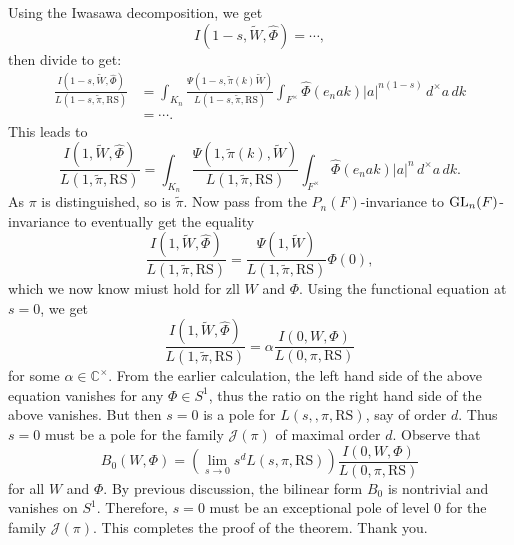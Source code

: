 \documentclass[reqno]{amsart} 
\begin{document}
Using the Iwasawa decomposition, we get
\begin{equation*}
  I(1 - s, \tilde{W}, \hat{\Phi})
  = \dotsb,
\end{equation*}
then divide to get:
\begin{align*}
  \frac{I(1 - s, \tilde{W}, \hat{\Phi})}{L(1 - s, \tilde{\pi}, \mathrm{RS})}
  &= \int_{K_n}
    \frac{\Psi(1 - s, \tilde{\pi}(k) \tilde{W})}{ L(1 - s, \tilde{\pi}, \mathrm{RS})}
    \int_{F^\times} \hat{\Phi}(e_n a k) \lvert a \rvert^{n(1 - s)} \, d ^\times  a \, d k \\
  &=
    \dotsb.
\end{align*}
This leads to
\begin{equation*}
  \frac{I(1, \tilde{W}, \hat{\Phi})}{L(1, \tilde{\pi}, \mathrm{RS})}
  = \int_{K_n}
  \frac{\Psi(1, \tilde{\pi}(k), \tilde{W})}{L(1, \tilde{\pi}, \mathrm{RS})}
  \int_{F^\times} \hat{\Phi}(e_n a k) \lvert a \rvert^n \,d^\times a \, d k.
\end{equation*}
As $\pi$ is distinguished, so is $\tilde{\pi}$.  Now pass from the $P_n(F)$-invariance to $\operatorname{GL}_n(F)$-invariance to eventually get the equality
\begin{equation*}
  \frac{I(1, \tilde{W}, \hat{\Phi})}{L(1, \tilde{\pi}, \mathrm{RS})}
  =
  \frac{\Psi(1, \tilde{W})}{ L(1, \tilde{\pi}, \mathrm{RS})}
  \Phi(0),
\end{equation*}
which we  now know miust hold for zll $W$ and $\Phi$.  Using the functional equation at $s = 0$, we get
\begin{equation*}
  \frac{I(1, \tilde{W}, \hat{\Phi})}{L(1, \tilde{\pi}, \mathrm{RS})}
  =
  \alpha
  \frac{I(0, {W}, {\Phi})}{L(0, {\pi}, \mathrm{RS})}
\end{equation*}
for some $\alpha \in \mathbb{C}^\times$.  From the earlier calculation, the left hand side of the above equation vanishes for any $\Phi \in S^1$, thus the ratio on the right hand side of the above vanishes.  But then $s = 0$ is a pole for $L(s,, \pi, \mathrm{RS})$, say of order $d$.  Thus $s =0$ must be a pole for the family $\mathcal{J}(\pi)$ of maximal order $d$.  Observe that
\begin{equation*}
  B_0(W, \Phi) = \left( \lim_{s \rightarrow 0} s^d L(s, \pi, \mathrm{RS}) \right)
  \frac{I(0, W, \Phi)}{ L(0, \pi, \mathrm{RS})}
\end{equation*}
for all $W$ and $\Phi$.  By previous discussion, the bilinear form $B_0$ is nontrivial and vanishes on $S^1$.  Therefore, $s =0$ must be an exceptional pole of level $0$ for the family $\mathcal{J}(\pi)$.  This completes the proof of the theorem.  Thank you.
\end{document}
